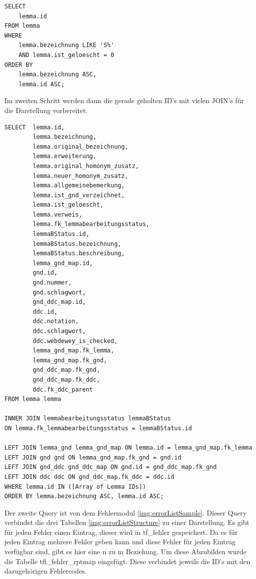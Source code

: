 \lstset{language=SQL}
\begin{lstlisting}[frame=single] 
    SELECT
    lemma.id
FROM lemma
WHERE
    lemma.bezeichnung LIKE 'S%'
    AND lemma.ist_geloescht = 0
ORDER BY
    lemma.bezeichnung ASC,
    lemma.id ASC;
\end{lstlisting}

Im zweiten Schritt werden dann die gerade geholten ID’s mit vielen JOIN’s für die Darstellung vorbereitet.

\lstset{language=SQL}
\begin{lstlisting}[frame=single] 
SELECT  lemma.id,                        
        lemma.bezeichnung,                
        lemma.original_bezeichnung,     
        lemma.erweiterung,               
        lemma.original_homonym_zusatz,  
        lemma.neuer_homonym_zusatz,      
        lemma.allgemeinebemerkung,       
        lemma.ist_gnd_verzeichnet,      
        lemma.ist_geloescht,             
        lemma.verweis,                  
        lemma.fk_lemmabearbeitungsstatus, 
        lemmaBStatus.id,               
        lemmaBStatus.bezeichnung,    
        lemmaBStatus.beschreibung,              
        lemma_gnd_map.id,                 
        gnd.id,               
        gnd.nummer,                   
        gnd.schlagwort,             
        gnd_ddc_map.id,              
        ddc.id,                      
        ddc.notation,               
        ddc.schlagwort,             
        ddc.webdewey_is_checked,        
        lemma_gnd_map.fk_lemma,
        lemma_gnd_map.fk_gnd,          
        gnd_ddc_map.fk_gnd,         
        gnd_ddc_map.fk_ddc,                
        ddc.fk_ddc_parent            
FROM lemma lemma
      
INNER JOIN lemmabearbeitungsstatus lemmaBStatus
ON lemma.fk_lemmabearbeitungsstatus = lemmaBStatus.id

LEFT JOIN lemma_gnd lemma_gnd_map ON lemma.id = lemma_gnd_map.fk_lemma
LEFT JOIN gnd gnd ON lemma_gnd_map.fk_gnd = gnd.id
LEFT JOIN gnd_ddc gnd_ddc_map ON gnd.id = gnd_ddc_map.fk_gnd
LEFT JOIN ddc ddc ON gnd_ddc_map.fk_ddc = ddc.id
WHERE lemma.id IN ([Array of Lemma IDs])
ORDER BY lemma.bezeichnung ASC, lemma.id ASC;

\end{lstlisting}

Der zweite Query ist von dem Fehlermodul \ref{img:errorListSample}. Dieser Query verbindet die drei Tabellen \ref{img:errorListStructure} zu einer Darstellung. Es gibt für jeden Fehler einen Eintrag, dieser wird in tf\_fehler gespeichert. Da es für jeden Eintrag mehrere Fehler geben kann und diese Fehler für jeden Eintrag verfügbar sind, gibt es hier eine n zu m Beziehung. Um diese Abzubilden wurde die Tabelle tfl\_fehler\_rptmap eingefügt. Diese verbindet jeweils die ID’s mit den dazugehörigen Fehlercodes. 

